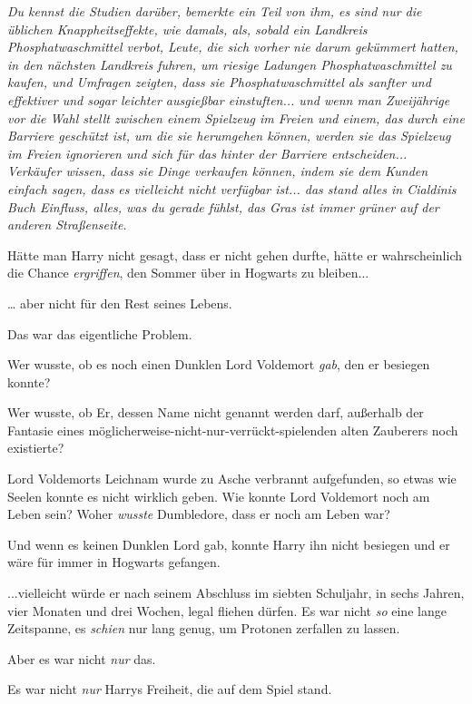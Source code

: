 {\emph{\emph{Du} kennst \emph{die} \emph{Studien} \emph{darüber}, bemerkte ein Teil von ihm, \emph{es sind nur die üblichen Knappheitseffekte}, \emph{wie damals, als, sobald ein Landkreis Phosphatwaschmittel verbot, Leute, die sich vorher nie darum gekümmert hatten, in den nächsten Landkreis fuhren, um riesige Ladungen Phosphatwaschmittel zu kaufen, und Umfragen zeigten, dass sie Phosphatwaschmittel als sanfter und effektiver und sogar leichter ausgießbar einstuften}... \emph{und wenn man Zweijährige vor die Wahl stellt zwischen einem Spielzeug im Freien und einem, das durch eine Barriere geschützt ist, um die sie herumgehen können, werden sie das Spielzeug im Freien ignorieren und sich für das hinter der Barriere entscheiden}... \emph{Verkäufer wissen, dass sie Dinge verkaufen können, indem sie dem Kunden einfach sagen, dass es vielleicht nicht verfügbar ist}... \emph{das stand alles in Cialdinis Buch} Einfluss, \emph{alles, was du gerade fühlst, das Gras ist immer grüner auf der anderen Straßenseite.}}

Hätte man Harry nicht gesagt, dass er nicht gehen durfte, hätte er wahrscheinlich die Chance \emph{ergriffen}, den Sommer über in Hogwarts zu bleiben...

… aber nicht für den Rest seines Lebens.

Das war das eigentliche Problem.

Wer wusste, ob es noch einen Dunklen Lord Voldemort \emph{gab}, den er besiegen konnte?

Wer wusste, ob Er, dessen Name nicht genannt werden darf, außerhalb der Fantasie eines möglicherweise-nicht-nur-verrückt-spielenden alten Zauberers noch existierte?

Lord Voldemorts Leichnam wurde zu Asche verbrannt aufgefunden, so etwas wie Seelen konnte es nicht wirklich geben. Wie konnte Lord Voldemort noch am Leben sein? Woher \emph{wusste} Dumbledore, dass er noch am Leben war?

Und wenn es keinen Dunklen Lord gab, konnte Harry ihn nicht besiegen und er wäre für immer in Hogwarts gefangen.

...vielleicht würde er nach seinem Abschluss im siebten Schuljahr, in sechs Jahren, vier Monaten und drei Wochen, legal fliehen dürfen. Es war nicht \emph{so} eine lange Zeitspanne, es \emph{schien} nur lang genug, um Protonen zerfallen zu lassen.

Aber es war nicht \emph{nur} das.

Es war nicht \emph{nur} Harrys Freiheit, die auf dem Spiel stand.

}
